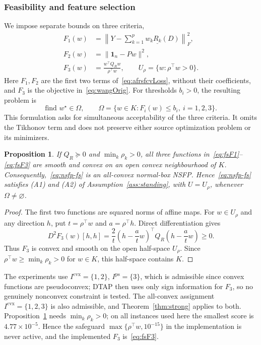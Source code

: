 \documentclass[]{interact}
\theoremstyle{plain}
\newtheorem{proposition}[theorem]{Proposition}
\theoremstyle{definition}
\theoremstyle{remark}
\newcommand{\cvx}{\mathrm{cvx}}
\newcommand{\ps}{\mathrm{ps}}
\begin{document}
\subsubsection{Feasibility and feature selection}\label{ssec:reduction}\label{ssec:selection}
We impose separate bounds on three criteria,
\begin{align}
F_1(w)&=\left\|Y-\sum_{k=1}^{p}w_k\underline{R_k}(D)\right\|_F^2,\label{eq:fsF1}\\
F_2(w)&=\|\mathbf1_n-Pw\|^2,\label{eq:fsF2}\\
F_3(w)&=\frac{w^{\top}Q_Rw}{\rho^{\top}w},\qquad U_\rho=\{w:\rho^{\top}w>0\}.\label{eq:fsF3}
\end{align}
Here $F_1,F_2$ are the first two terms of~\eqref{eq:afrsfcvLoss}, without their coefficients, and $F_3$ is the objective in~\eqref{eq:wangOrig}. For thresholds $b_i>0$, the resulting problem is
\begin{equation}\label{eq:nsfp-fs}
\text{find }w^\star\in\Omega,\qquad \Omega=\{w\in K:F_i(w)\le b_i,\ i=1,2,3\}.
\end{equation}
This formulation asks for simultaneous acceptability of the three criteria. It omits the Tikhonov term and does not preserve either source optimization problem or its minimizers.

\begin{proposition}\label{prop:fs-reg}
If $Q_R\succeq0$ and $\min_k\rho_k>0$, all three functions in~\eqref{eq:fsF1}--\eqref{eq:fsF3} are smooth and convex on an open convex neighbourhood of $K$. Consequently,~\eqref{eq:nsfp-fs} is an all-convex normal-box NSFP. Hence~\eqref{eq:nsfp-fs} satisfies (A1) and (A2) of Assumption~\ref{ass:standing}, with $U=U_\rho$, whenever $\Omega\ne\varnothing$.
\end{proposition}
\begin{proof}
The first two functions are squared norms of affine maps. For $w\in U_\rho$ and any direction $h$, put $t=\rho^{\top}w$ and $a=\rho^{\top}h$. Direct differentiation gives
\begin{equation}\label{eq:fsF3-curvature}
D^2F_3(w)[h,h]=\frac2t\left(h-\frac atw\right)^{\!\top}Q_R\left(h-\frac atw\right)\ge0.
\end{equation}
Thus $F_3$ is convex and smooth on the open half-space $U_\rho$. Since $\rho^{\top}w\ge\min_k\rho_k>0$ for $w\in K$, this half-space contains $K$.
\end{proof}

The experiments use $I^{\cvx}=\{1,2\}$, $I^{\ps}=\{3\}$, which is admissible since convex functions are pseudoconvex; DTAP then uses only sign information for $F_3$, so no genuinely nonconvex constraint is tested. The all-convex assignment $I^{\cvx}=\{1,2,3\}$ is also admissible, and Theorem~\ref{thm:strong} applies to both. Proposition~\ref{prop:fs-reg} needs $\min_k\rho_k>0$; on all instances used here the smallest score is $4.77\times10^{-5}$. Hence the safeguard $\max\{\rho^\top w,10^{-15}\}$ in the implementation is never active, and the implemented $F_3$ is~\eqref{eq:fsF3}.
\end{document}
